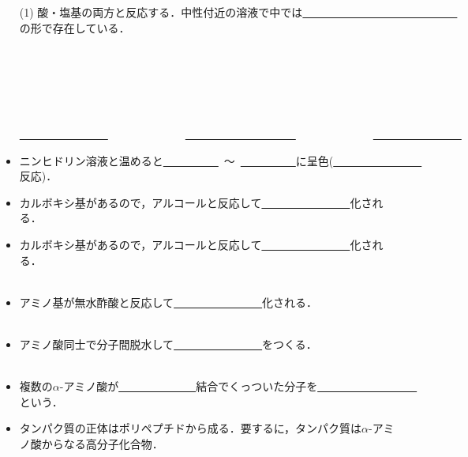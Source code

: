 \documentclass[a4paper,12pt]{ltjsarticle}
\begin{document}
\newpage
{}
\begin{itemize}
    \item [(1)]酸・塩基の両方と反応する．中性付近の溶液で中では\underline{　　　　　　　　　　　　　　}の形で存在している．
    \begin{figure}[H]
        \centering
        　 　
        　　
    \end{figure}
    \underline{　　　　　　　　}　　　　　　　\underline{　　　　　　　　　　}　　　　　　　\underline{　　　　　　　　}\\
    \item ニンヒドリン溶液と温めると\underline{　　　　　}~〜~\underline{　　　　　}に呈色(\underline{　　　　　　　　}反応)．\\
    \item カルボキシ基があるので，アルコールと反応して\underline{　　　　　　　　}化される．\\
    \item カルボキシ基があるので，アルコールと反応して\underline{　　　　　　　　}化される．\\[1cm]
    　\\[1cm]
    \item アミノ基が無水酢酸と反応して\underline{　　　　　　　　}化される．\\[1cm]
    　\\[1cm]
        \item アミノ酸同士で分子間脱水して\underline{　　　　　　　　}をつくる．\\[1cm]
    　\\[1cm]
\end{itemize}
\newpage
{}
\begin{itemize}
    \item 複数の$\alpha$-アミノ酸が\underline{　　　　　　　}結合でくっついた分子を\underline{　　　　　　　　　}という．
    \item タンパク質の正体はポリペプチドから成る．要するに，タンパク質は$\alpha$-アミノ酸からなる高分子化合物．
\end{itemize}
\end{document}
